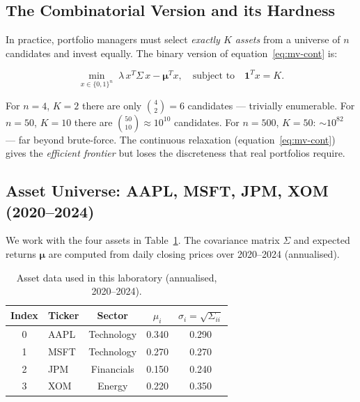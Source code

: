 \documentclass[a4paper,11pt]{article}
\begin{document}
\subsection{The Combinatorial Version and its Hardness}

In practice, portfolio managers must select \emph{exactly $K$ assets}
from a universe of $n$ candidates and invest equally. The binary version
of equation~\eqref{eq:mv-cont} is:

\begin{equation}
    \min_{x \in \{0,1\}^n}\; \lambda\, x^T \Sigma\, x
    - \boldsymbol\mu^T x,
    \quad\text{subject to}\quad \mathbf{1}^T x = K.
    \label{eq:mv-binary}
\end{equation}

For $n=4$, $K=2$ there are only $\binom{4}{2} = 6$ candidates — trivially
enumerable. For $n=50$, $K=10$ there are $\binom{50}{10} \approx 10^{10}$
candidates. For $n=500$, $K=50$: $\sim\!10^{82}$ — far beyond brute-force.
The continuous relaxation (equation~\eqref{eq:mv-cont}) gives the
\emph{efficient frontier} but loses the discreteness that real portfolios
require.

\subsection{Asset Universe: AAPL, MSFT, JPM, XOM (2020--2024)}

We work with the four assets in Table~\ref{tab:assets}. The covariance
matrix $\Sigma$ and expected returns $\boldsymbol\mu$ are computed from
daily closing prices over 2020--2024 (annualised).

\begin{table}[H]
\centering
\caption{Asset data used in this laboratory (annualised, 2020--2024).}
\label{tab:assets}
\begin{tabular}{clccc}
    \toprule
    Index & Ticker & Sector & $\mu_i$ & $\sigma_i = \sqrt{\Sigma_{ii}}$ \\
    \midrule
    0 & AAPL  & Technology    & 0.340 & 0.290 \\
    1 & MSFT  & Technology    & 0.270 & 0.270 \\
    2 & JPM   & Financials    & 0.150 & 0.240 \\
    3 & XOM   & Energy        & 0.220 & 0.350 \\
    \bottomrule
\end{tabular}
\end{table}
\end{document}
